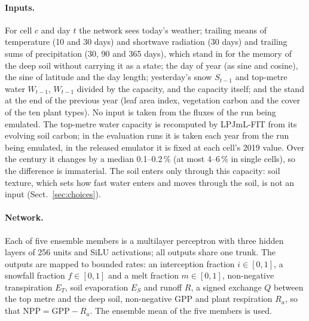 \documentclass[11pt,a4paper]{article}
\begin{document}
\paragraph{Inputs.} For cell $c$ and day $t$ the network sees today's weather; trailing means of temperature (10 and
30 days) and shortwave radiation (30 days) and trailing sums of precipitation (30, 90 and 365 days), which stand in for
the memory of the deep soil without carrying it as a state; the day of year (as sine and cosine), the sine of latitude
and the day length; yesterday's snow $S_{t-1}$ and top-metre water $W_{t-1}$, $W_{t-1}$ divided by the capacity, and
the capacity itself; and the stand at the end of the previous year (leaf area index, vegetation carbon and the cover of
the ten plant types). No input is taken from the fluxes of the run being emulated. The top-metre water capacity is
recomputed by LPJmL-FIT from its evolving soil carbon; in the evaluation runs it is taken each year from the run being
emulated, in the released emulator it is fixed at each cell's 2019 value. Over the century it changes by a median
0.1--0.2\,\% (at most 4--6\,\% in single cells), so the difference is immaterial. The soil enters only through this
capacity: soil texture, which sets how fast water enters and moves through the soil, is not an input
(Sect.~\ref{sec:choices}).

\paragraph{Network.} Each of five ensemble members is a multilayer perceptron with three hidden layers of 256 units
and SiLU activations; all outputs share one trunk. The outputs are mapped to bounded rates: an interception fraction
$i\in[0,1]$, a snowfall fraction $f\in[0,1]$ and a melt fraction $m\in[0,1]$, non-negative transpiration $E_T$, soil
evaporation $E_S$ and runoff $R$, a signed exchange $Q$ between the top metre and the deep soil, non-negative GPP and
plant respiration $R_a$, so that $\mathrm{NPP} = \mathrm{GPP} - R_a$. The ensemble mean of the five members is used.
\end{document}
